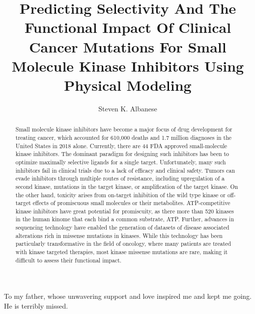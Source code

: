 \documentclass[phd,tocprelim]{cornell}
\title {Predicting Selectivity And The Functional Impact Of Clinical Cancer Mutations For Small Molecule Kinase Inhibitors Using Physical Modeling}
\author {Steven K. Albanese}
\DeclareRobustCommand{\gobblefive}[5]{}
\newcommand*{\SkipTocEntry}{\addtocontents{toc}{\gobblefive}}
\begin{document}
\maketitle
\makecopyright

\SkipTocEntry\begin{dedication}
	To my father, whose unwavering support and love inspired me and kept me going. He is terribly missed. 
\end{dedication}


\begin{abstract}
Small molecule kinase inhibitors have become a major focus of drug development for treating cancer, which accounted for 610,000 deaths and 1.7 million diagnoses in the United States in 2018 alone. Currently, there are 44 FDA approved small-molecule kinase inhibitors. The dominant paradigm for designing such inhibitors has been to optimize maximally selective ligands for a single target. Unfortunately, many such inhibitors fail in clinical trials due to a lack of efficacy and clinical safety. Tumors can evade inhibitors through multiple routes of resistance, including upregulation of a second kinase, mutations in the target kinase, or amplification of the target kinase. On the other hand, toxicity arises from on-target inhibition of the wild type kinase or off-target effects of promiscuous small molecules or their metabolites. ATP-competitive kinase inhibitors have great potential for promiscuity, as there more than 520 kinases in the human kinome that each bind a common substrate, ATP. Further, advances in sequencing technology have enabled the generation of datasets of disease associated alterations rich in missense mutations in kinases. While this technology has been particularly transformative in the field of oncology, where many patients are treated with kinase targeted therapies, most kinase missense mutations are rare, making it difficult to assess their functional impact. 

\end{abstract}
\end{document}

